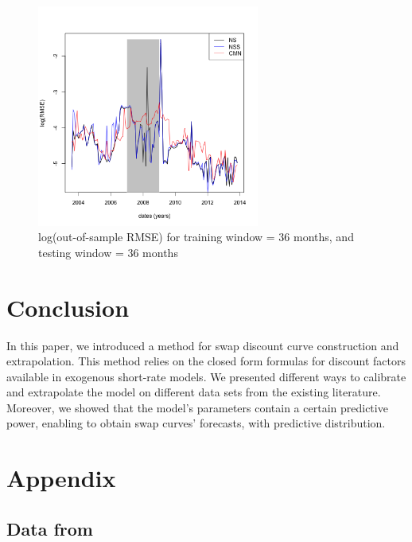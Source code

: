 \begin{figure}[!htb]
\centering
  \includegraphics[width=0.65\textwidth]{gfx/chapter-yc-insurance/forecasting_graph8}
\caption{log(out-of-sample RMSE) for training window = 36 months, and testing window = 36 months}
\label{forecast:8}       %
\end{figure}

\section{Conclusion}

In this paper, we introduced a method for swap discount curve construction and extrapolation. This method relies on the closed form formulas for discount factors available in exogenous short-rate models. We presented different ways to calibrate and extrapolate the model on different data sets from the existing literature. Moreover, we showed that the model's parameters contain a certain predictive power, enabling to obtain swap curves' forecasts, with predictive distribution.

\newpage
\newpage

\section{Appendix}

\subsection{Data from \cite{andersen2010interest}}


